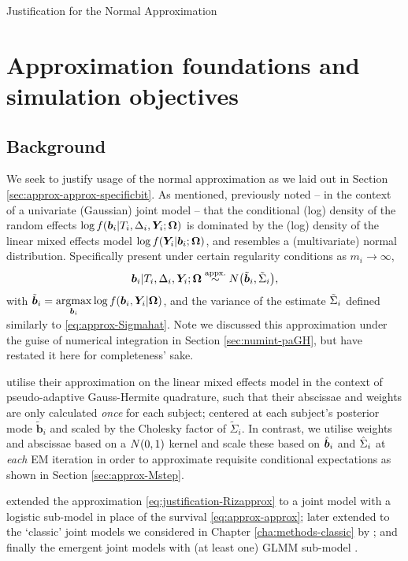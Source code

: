 \begin{chapter}{\label{cha:justification}Justification for the Normal Approximation}
  \section{Approximation foundations and simulation objectives}\label{sec:justification-background-objectives}
  \subsection{Background}\label{sec:justification-background}
  We seek to justify usage of the normal approximation as we laid out in Section \ref{sec:approx-approx-specificbit}. As mentioned, \citet{Rizopoulos2012} previously noted -- in the context of a univariate (Gaussian) joint model -- that the conditional (log) density of the random effects $\log f(\bm{b}_i|T_i,\Delta_i,\bm{Y}_i;\bm{\mathrm{\Omega}})$ is dominated by the (log) density of the linear mixed effects model $\log f(\bm{Y}_i|\bm{b}_i;\bm{\mathrm{\Omega}})$, and resembles a (multivariate) normal distribution. Specifically \citet{Rizopoulos2012} present under certain regularity conditions as $m_i\rightarrow\infty$,  
  \begin{align}
    \bm{b}_i|T_i,\Delta_i,\bm{Y}_i;\bm{\mathrm{\Omega}}\overset{\text{appx.}}{\sim} N\big(\tilde{\bm{b}}_i,\tilde{\Sigma}_i\big),
  \label{eq:justification-Rizapprox}
  \end{align}
  with $\tilde{\bm{b}}_i=\underset{\bm{b}_i}{\rm{argmax}}\log f(\bm{b}_i, \bm{Y}_i| \bm{\mathrm{\Omega}})$, and the variance of the estimate $\tilde{\Sigma}_i$ defined similarly to \eqref{eq:approx-Sigmahat}. Note we discussed this approximation under the guise of numerical integration in Section \ref{sec:numint-paGH}, but have restated it here for completeness' sake.
  
  \citet{Rizopoulos2012} utilise their approximation on the linear mixed effects model in the context of pseudo-adaptive Gauss-Hermite quadrature, such that their abscissae and weights are only calculated \textit{once} for each subject; centered at each subject's posterior mode $\tilde{\bm{b}}_i$ and scaled by the Cholesky factor of $\tilde{\Sigma}_i$. In contrast, we utilise weights and abscissae based on a $N\!\left(0,1\right)$ kernel and scale these based on $\hat{\bm{b}}_i$ and $\hat{\Sigma}_i$ at \textit{each} EM iteration in order to approximate requisite conditional expectations as shown in Section \ref{sec:approx-Mstep}.

  \citet{Bernhardt15} extended the approximation \eqref{eq:justification-Rizapprox} to a joint model with a logistic sub-model in place of the survival \eqref{eq:approx-approx}; later extended to the `classic' joint models we considered in Chapter \ref{cha:methods-classic} by \citet{Murray2022}; and finally the emergent joint models with (at least one) GLMM sub-model \citep{Murray2023}.


\end{chapter}
